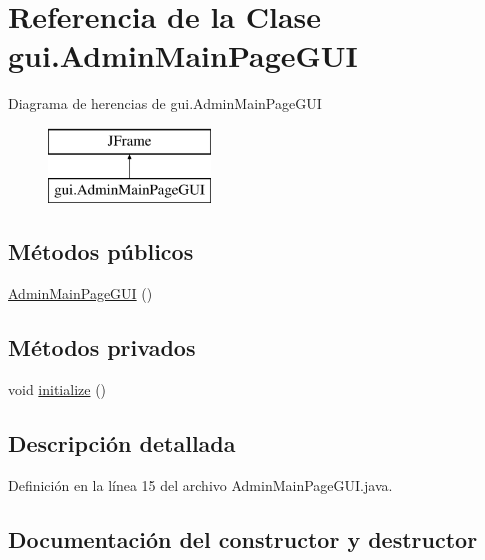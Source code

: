 \hypertarget{classgui_1_1AdminMainPageGUI}{}\section{Referencia de la Clase gui.\+Admin\+Main\+Page\+G\+UI}
\label{classgui_1_1AdminMainPageGUI}
Diagrama de herencias de gui.\+Admin\+Main\+Page\+G\+UI\begin{figure}[H]
\begin{center}
\leavevmode
\includegraphics[height=2.000000cm]{classgui_1_1AdminMainPageGUI}
\end{center}
\end{figure}
\subsection*{Métodos públicos}
\begin{DoxyCompactItemize}
\item 
\mbox{\hyperlink{classgui_1_1AdminMainPageGUI_a633665cdf87463b9d1ed9207dc813f93}{Admin\+Main\+Page\+G\+UI}} ()
\end{DoxyCompactItemize}
\subsection*{Métodos privados}
\begin{DoxyCompactItemize}
\item 
void \mbox{\hyperlink{classgui_1_1AdminMainPageGUI_a164db51de4acb1b545621e6d8ef09bf3}{initialize}} ()
\end{DoxyCompactItemize}


\subsection{Descripción detallada}


Definición en la línea 15 del archivo Admin\+Main\+Page\+G\+U\+I.\+java.



\subsection{Documentación del constructor y destructor}
\mbox{\label{classgui_1_1AdminMainPageGUI_a633665cdf87463b9d1ed9207dc813f93}} 
